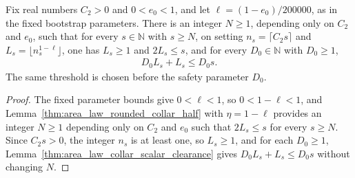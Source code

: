 \begin{lemma}
    \label{thm:area_law_bootstrap_collar_clearance}
    \leanok
    Fix real numbers $C_2>0$ and $0<e_0<1$, and let
    $\ell=(1-e_0)/200000$, as in the fixed bootstrap parameters.
    There is an integer $N\ge1$, depending only on $C_2$ and
    $e_0$, such that for every $s\in\mathbb N$ with $s\ge N$, on setting
    $n_s=\lceil C_2s\rceil$ and $L_s=\lfloor n_s^{1-\ell}\rfloor$, one
    has $L_s\ge1$ and $2L_s\le s$, and for every
    $D_0\in\mathbb N$ with $D_0\ge1$,
    \begin{align}
        D_0L_s+L_s\le D_0s.
    \end{align}
    The same threshold is chosen before the safety parameter $D_0$.
\end{lemma}
\begin{proof}
    \leanok
    The fixed parameter bounds give $0<\ell<1$, so $0<1-\ell<1$, and
    Lemma~\ref{thm:area_law_rounded_collar_half} with
    $\eta=1-\ell$ provides an integer $N\ge1$ depending only on $C_2$ and $e_0$
    such that $2L_s\le s$ for every $s\ge N$. Since $C_2s>0$, the integer $n_s$
    is at least one, so $L_s\ge1$, and for each $D_0\ge1$,
    Lemma~\ref{thm:area_law_collar_scalar_clearance} gives
    $D_0L_s+L_s\le D_0s$ without changing $N$.
\end{proof}

